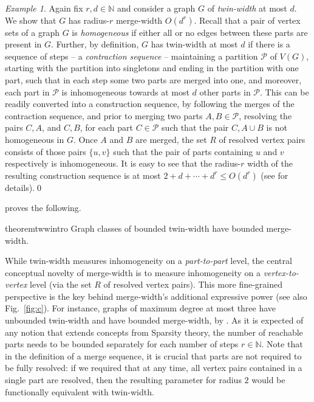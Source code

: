 \documentclass[11pt]{article}
\theoremstyle{remark}
\newtheorem{example}[theorem]{Example}
\newcommand{\set}[1]{\{#1\}}
\def\cal{\mathcal}
\def\N{\mathbb N}
\renewcommand{\le}{\leqslant}
\begin{document}
\begin{example}\label{ex:tww}
  Again fix $r,d\in\N$ and consider a graph $G$ of \emph{twin-width} at most $d$. We show that $G$ has radius-$r$ merge-width $O(d^r)$.
  Recall that a pair of vertex sets of a graph $G$ is  \emph{homogeneous} if  either all or no edges between these parts are present in $G$.
Further, by definition, $G$ has twin-width at most $d$ if there
is a sequence of steps -- a \emph{contraction sequence} -- maintaining a partition $\cal P$ of $V(G)$, starting with the partition into singletons and ending in the partition with one part, such that in each step some two parts are merged into one, and moreover, each part in $\cal P$ is inhomogeneous towards at most $d$ other parts in $\cal P$. This can be readily converted into a construction sequence, by following the merges of the contraction sequence, and prior to merging two parts $A,B\in \cal P$, resolving the pairs $C,A$, and $C,B$, for each part $C\in\cal P$
such that the pair $C, A\cup B$ is not homogeneous in $G$.
Once $A$ and $B$ are merged, the set $R$ of resolved vertex pairs
consists of those pairs $\set{u,v}$ such that the pair of parts containing $u$ and $v$ respectively is inhomogeneous. It is easy to see
that the radius-$r$ width of the resulting construction sequence is at most $2+d+\cdots+d^r\le O(d^r)$ (see  for details).\qed
\end{example}

 proves the following.
\begin{restatable}{theorem}{twwintro}\label{thm:tww}
  Graph classes of bounded twin-width have bounded merge-width.
\end{restatable}

While twin-width measures inhomogeneity on a \emph{part-to-part} level,
the central conceptual novelty of merge-width is
to measure inhomogeneity on a \emph{vertex-to-vertex} level (via the set $R$ of resolved vertex pairs).
This more fine-grained perspective is the key behind
merge-width's additional expressive power (see also Fig.~\ref{fig:c}). For instance,
 graphs of maximum degree at most three have unbounded twin-width \cite{tww2}
and have bounded merge-width, by .
As it is expected of any notion that extends concepts from Sparsity theory, the number of reachable parts
needs to be bounded separately for each number of steps \(r \in \N\).
Note that in the definition of a merge sequence, it is crucial that parts are not required to be fully resolved:
if we required that at any time, all vertex pairs contained in a single part are resolved, then 
the resulting parameter for radius $2$ would be functionally equivalent with twin-width.
\end{document}
